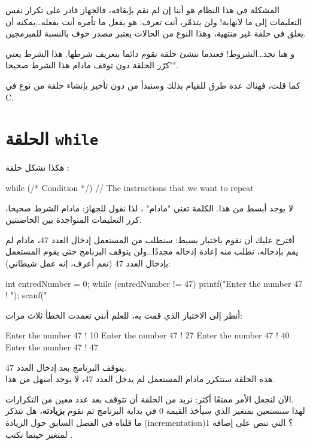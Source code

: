 المشكلة في هذا النظام هو أننا إن لم نقم بإيقافه، فالجهاز قادر على تكرار نفس التعليمات إلى ما لانهاية! ولن يتذمّر، أنت تعرف: هو يفعل ما تأمره أنت بفعله\dots يمكنه أن يعلق في حلقة غير منتهية، وهذا النوع من الحالات يعتبر مصدر خوف  بالنسبة للمبرمجين.

و هنا نجد\dots الشروط! فعندما ننشئ حلقة نقوم دائما بتعريف شرطها. هذا الشرط يعني "كرّر الحلقة دون توقف مادام هذا الشرط صحيحا".

كما قلت، فهناك عدة طرق للقيام بذلك وسنبدأ من دون تأخير بإنشاء حلقة من نوع 
في \textenglish{C}.

\section{الحلقة \texttt{while}}

هكذا نشكل حلقة 
:

\begin{Csource}
while (/* Condition */)
{
	// The instructions that we want to repeat
}
\end{Csource}

لا يوجد أبسط من هذا. الكلمة 
تعني "مادام" ، لذا نقول للجهاز: مادام الشرط صحيحا، كرر التعليمات المتواجدة بين الحاضنتين.

أقترح عليك أن نقوم باختبار بسيط: سنطلب من المستعمل إدخال العدد 47، مادام لم يقم بإدخاله، نطلب منه إعادة إدخاله مجددًا\dots ولن يتوقف البرنامج حتى يقوم المستعمل بإدخال العدد 47 (نعم أعرف، إنه عمل شيطاني):

\begin{Csource}
int entredNumber = 0;
while (entredNumber != 47)
{
	printf("Enter the number 47 ! ");
	scanf("%
}
\end{Csource}

أنظر إلى الاختبار الذي قمت به، للعلم أنني تعمدت الخطأ ثلاث مرات:

\begin{Console}
Enter the number 47 ! 10
Enter the number 47 ! 27
Enter the number 47 ! 40
Enter the number 47 ! 47
\end{Console}

يتوقف البرنامج بعد إدخال العدد 47.\\
 هذه الحلقة 
 ستتكرر مادام المستعمل لم يدخل العدد 47، لا يوجد أسهل من هذا.
 
الآن لنجعل الأمر ممتعًا أكثر: نريد من الحلقة أن تتوقف بعد عدد معين من التكرارات.\\
لهذا سنستعين بمتغير
الذي سيأخذ القيمة $ 0 $ في بداية البرنامج ثم نقوم 
\textbf{بزيادته}،
 هل تتذكر ما قلناه في الفصل السابق حول الزيادة 
(\textenglish{incrementation})؟
 التي تنص على إضافة 1 لمتغير حينما نكتب
.


